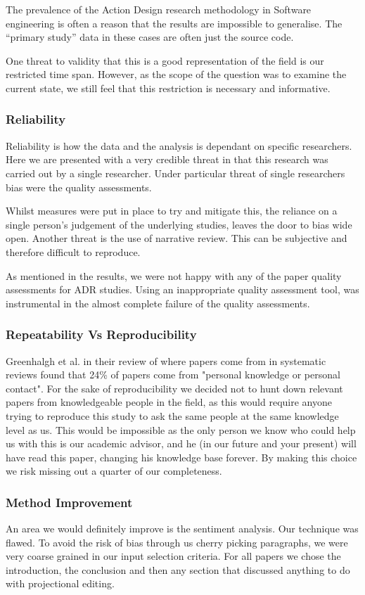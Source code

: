 The prevalence of the Action Design research methodology in Software engineering is often a reason that the results are impossible to generalise.
The ``primary study'' data in these cases are often just the source code.

One threat to validity that this is a good representation of the field is our restricted time span.
However, as the scope of the question was to examine the current state, we still feel that this restriction is necessary and informative.

\subsubsection{Reliability}
Reliability is how the data and the analysis is dependant on specific researchers.
Here we are presented with a very credible threat in that this research was carried out by a single researcher.
Under particular threat of single researchers bias were the quality assessments. 

Whilst measures were put in place to try and mitigate this, the reliance on a single person's judgement of the underlying studies, leaves the door to bias wide open.
Another threat is the use of narrative review. 
This can be subjective and therefore difficult to reproduce.

As mentioned in the results, we were not happy with any of the paper quality assessments for ADR studies.
Using an inappropriate quality assessment tool, was instrumental in the almost complete failure of the quality assessments.


\subsubsection{Repeatability Vs Reproducibility}
Greenhalgh et al.\cite{GreenhalghTrisha2005Eaeo} in their review of where papers come from in systematic reviews found that 24\% of papers come from "personal knowledge or personal contact".
For the sake of reproducibility we decided not to hunt down relevant papers from knowledgeable people in the field, as this would require anyone trying to reproduce this study to ask the same people at the same knowledge level as us.
This would be impossible as the only person we know who could help us with this is our academic advisor, and he (in our future and your present) will have read this paper, changing his knowledge base forever.
By making this choice we risk missing out a quarter of our completeness.

\subsubsection{Method Improvement}
An area we would definitely improve is the sentiment analysis.
Our technique was flawed.
To avoid the risk of bias through us cherry picking paragraphs, we were very coarse grained in our input selection criteria.
For all papers we chose the introduction, the conclusion and then any section that discussed anything to do with projectional editing.

